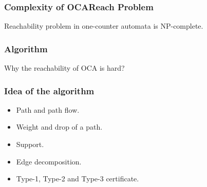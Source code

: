 \documentclass[11pt]{beamer}
\begin{document}
\begin{frame}\frametitle{Complexity of OCAReach Problem}

\begin{theorem}
Reachability problem in one-counter automata is NP-complete.
\end{theorem}

\end{frame}

\begin{frame}\frametitle{Algorithm}
Why the reachability of OCA is hard?

\end{frame}

\begin{frame}\frametitle{Idea of the algorithm}
\begin{itemize}
\item Path and path flow.
\item Weight and drop of a path.
\item Support.
\item Edge decomposition.
\item Type-1, Type-2 and Type-3 certificate.
\end{itemize}

\end{frame}
\end{document}
